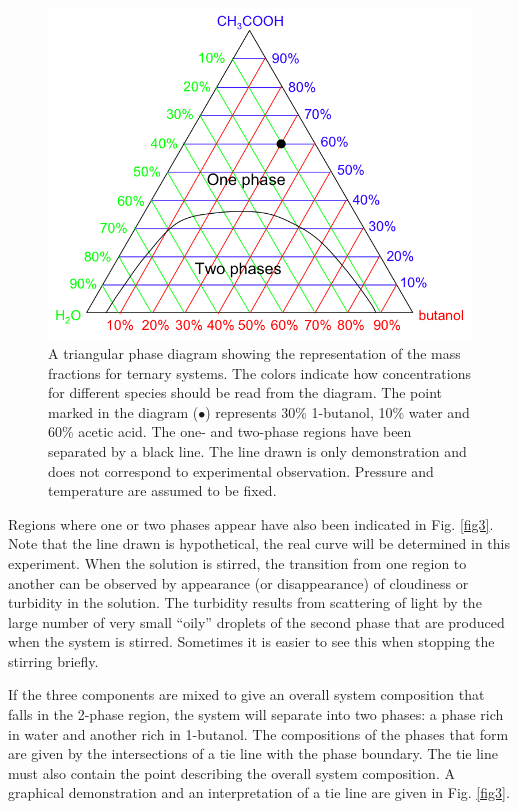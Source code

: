 \documentclass[byrevtex,amssymb,aps,pra,floatfix,letterpaper]{revtex4}
\begin{document}
\begin{figure}[!htp]
\begin{center}
\includegraphics[scale=0.5]{fig2}
\caption{A triangular phase diagram showing the representation of the mass fractions for ternary systems. The colors indicate how concentrations for different species should be read from the diagram. The point marked in the diagram ($\bullet$) represents 30\% 1-butanol, 10\% water and 60\% acetic acid. The one- and two-phase regions have been separated by a black line. The line drawn is only demonstration and does not correspond to experimental observation. Pressure and temperature are assumed to be fixed.}
\label{fig2}
\end{center}
\end{figure}

Regions where one or two phases appear have also been indicated in Fig. \ref{fig3}. Note that the line drawn is hypothetical, the real curve will be determined in this experiment. When the solution is stirred, the transition from one region to another can be observed by appearance (or disappearance) of cloudiness or turbidity in the solution. The turbidity results from scattering of light by the large number of very small ``oily'' droplets of the second phase that are produced when the system is stirred. Sometimes it is easier to see this when stopping the stirring briefly.

If the three components are mixed to give an overall system composition that falls in the 2-phase region, the system will separate into two phases: a phase rich in water and another rich in 1-butanol. The compositions of the phases that form are given by the intersections of a tie line with the phase boundary. The tie line must also contain the point describing the overall system composition. A graphical demonstration and an interpretation of a tie line are given in Fig. \ref{fig3}.
\end{document}
